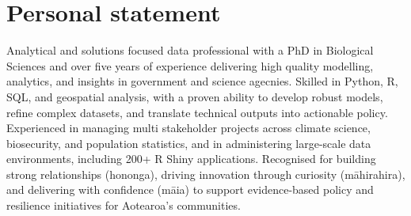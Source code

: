 \section{Personal statement}
Analytical and solutions focused data professional with a PhD in Biological Sciences and over five years of experience delivering
high quality modelling, analytics, and insights in government and science agecnies. Skilled in Python, R, SQL, and geospatial analysis,
with a proven ability to develop robust models, refine complex datasets, and translate technical outputs into actionable policy.
Experienced in managing multi stakeholder projects across climate science, biosecurity, and population statistics, and in administering
large-scale data environments, including 200+ R Shiny applications. Recognised for building strong relationships (hononga),
driving innovation through curiosity (māhirahira), and delivering with confidence (māia) to support evidence-based policy 
and resilience initiatives for Aotearoa’s communities.